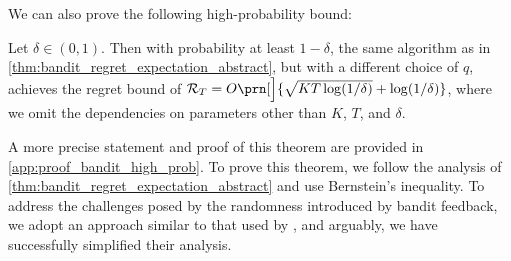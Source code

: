 We can also prove the following high-probability bound:
\begin{theorem}\label{thm:bandit_high_prob}
Let $\delta \in (0,1)$.
Then with probability at least $1 - \delta$, the same algorithm as in \cref{thm:bandit_regret_expectation_abstract}, but with a different choice of $q$, achieves the regret bound of 
$\mathcal{R}_T = O\prn[\Big]{\sqrt{KT \log (1/\delta)} + \log(1/\delta)}$,
where we omit the dependencies on parameters other than $K$, $T$, and $\delta$.
\end{theorem}
A more precise statement and proof of this theorem are provided in \cref{app:proof_bandit_high_prob}.
To prove this theorem, we follow the analysis of \cref{thm:bandit_regret_expectation_abstract} and use Bernstein's inequality.  
To address the challenges posed by the randomness introduced by bandit feedback,  
we adopt an approach similar to that used by \citet{NEURIPS2021_Hoeven}, and
arguably, we have successfully simplified their analysis.


